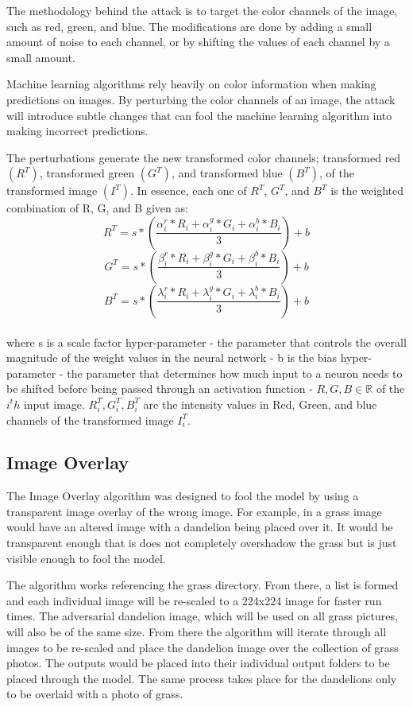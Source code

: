 \documentclass{article}
\begin{document}
The methodology behind the attack is to target the color channels of the image, such as red, green, and blue. The modifications are done by adding a small amount of noise to each channel, or by shifting the values of each channel by a small amount. 

Machine learning algorithms rely heavily on color information when making predictions on images. By perturbing the color channels of an image, the attack will introduce subtle changes that can fool the machine learning algorithm into making incorrect predictions.

The perturbations generate the new transformed color channels; transformed red $(R^T)$, transformed green $(G^T)$, and transformed blue $(B^T)$, of the transformed image $(I^T)$. In essence, each one of $R^T$, $G^T$, and $B^T$ is the weighted combination of R, G, and B given as: 
$$R^T = s * (\frac{\alpha^r_i * R_i + \alpha^g_i * G_i + \alpha^b_i * B_i}{3}) + b$$
$$G^T = s * (\frac{\beta^r_i * R_i + \beta^g_i * G_i + \beta^b_i * B_i}{3}) + b$$
$$B^T = s * (\frac{\lambda^r_i * R_i + \lambda^g_i * G_i + \lambda^b_i * B_i}{3}) + b$$
\\
where s is a scale factor hyper-parameter - the parameter that controls the overall magnitude of the weight values in the neural network - b is the bias hyper-parameter - the parameter that determines how much input to a neuron needs to be shifted before being passed through an activation function - ${R, G, B} \in \mathbb{R}$ of the $i^th$ input image. $R^T_i, G^T_i, B^T_i$ are the intensity values in Red, Green, and blue channels of the transformed image $I^T_i$.
\\

\subsection{Image Overlay}
The Image Overlay algorithm was designed to fool the model by using a transparent image overlay of the wrong image. For example, in a grass image would have an altered image with a dandelion being placed over it. It would be transparent enough that is does not completely overshadow the grass but is just visible enough to fool the model. 

The algorithm works referencing the grass directory. From there, a list is formed and each individual image will be re-scaled to a 224x224 image for faster run times. The adversarial dandelion image, which will be used on all grass pictures, will also be of the same size. From there the algorithm will iterate through all images to be re-scaled and place the dandelion image over the collection of grass photos. The outputs would be placed into their individual output folders to be placed through the model. The same process takes place for the dandelions only to be overlaid with a photo of grass. 
\end{document}

